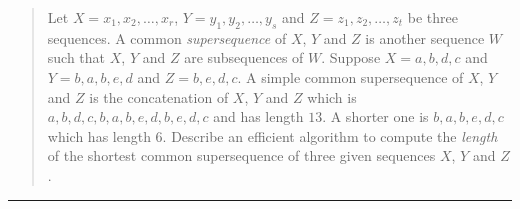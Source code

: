 \documentclass[11pt]{article}
\begin{document}



\begin{quote}
	Let $X = x_1,x_2,\ldots,x_r$, $Y = y_1,y_2,\ldots,y_s$ and $Z =
  z_1,z_2,\ldots,z_t$ be three sequences. A common {\em supersequence}
  of $X$, $Y$ and $Z$ is another sequence $W$ such that $X$, $Y$ and $Z$
  are subsequences of $W$. Suppose $X = a,b,d,c$ and $Y = b,a,b,e,d$ and $Z =
  b, e, d, c$. A simple common supersequence of $X$, $Y$ and $Z$ is
  the concatenation of $X$, $Y$ and $Z$ which is
  $a,b,d,c,b,a,b,e,d,b,e,d,c$ and has length $13$. A shorter one is
  $b, a, b, e, d, c$ which has length $6$.  Describe an efficient
  algorithm to compute the {\em length} of the shortest common
  supersequence of three given sequences $X$, $Y$ and $Z$.
\end{quote}
\hrule
\end{document}
